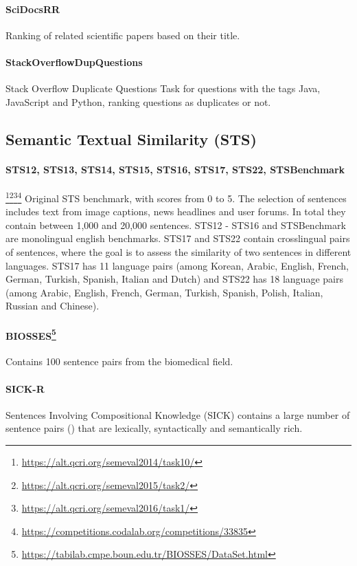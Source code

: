 \documentclass[11pt]{article}
\begin{document}
\paragraph{SciDocsRR} \cite{cohan2020scidocs} Ranking of related scientific papers based on their title.

\paragraph{StackOverflowDupQuestions} \cite{liu2018linkso} Stack Overflow Duplicate Questions Task for questions with the tags Java, JavaScript and Python, ranking questions as duplicates or not.

\subsection{Semantic Textual Similarity (STS)}

\paragraph{STS12, STS13, STS14, STS15, STS16, STS17, STS22, STSBenchmark} \cite{agirre2012semeval, agirre2013sem}\footnote{\url{https://alt.qcri.org/semeval2014/task10/}}\footnote{\url{https://alt.qcri.org/semeval2015/task2/}}\footnote{\url{https://alt.qcri.org/semeval2016/task1/}}\footnote{\url{https://competitions.codalab.org/competitions/33835}} Original STS benchmark, with scores from 0 to 5. The selection of sentences includes text from image captions, news headlines and user forums. In total they contain between 1,000 and 20,000 sentences. STS12 - STS16 and STSBenchmark are monolingual english benchmarks. STS17 and STS22 contain crosslingual pairs of sentences, where the goal is to assess the similarity of two sentences in different languages. STS17 has 11 language pairs (among Korean, Arabic, English, French, German, Turkish, Spanish, Italian and Dutch) and STS22 has 18 language pairs (among Arabic, English, French, German, Turkish, Spanish, Polish, Italian, Russian and Chinese).

\paragraph{BIOSSES\footnote{\url{https://tabilab.cmpe.boun.edu.tr/BIOSSES/DataSet.html}}} Contains 100 sentence pairs from the biomedical field.

\paragraph{SICK-R} \cite{agirre2014semeval} Sentences Involving Compositional Knowledge (SICK) contains a large number of sentence pairs () that are lexically, syntactically and semantically rich.
\end{document}
